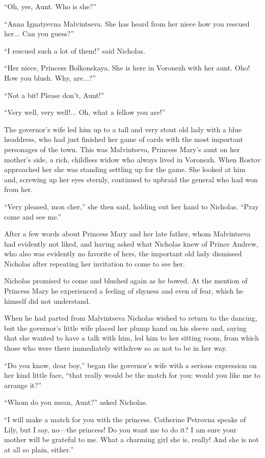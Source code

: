 ``Oh, yes, Aunt. Who is she?''

``Anna Ignatyevna Malvintseva. She has heard from her niece how
you rescued her... Can you guess?''

``I rescued such a lot of them!'' said Nicholas.

``Her niece, Princess Bolkonskaya. She is here in Voronezh with
her aunt.  Oho! How you blush. Why, are...?''

``Not a bit! Please don't, Aunt!''

``Very well, very well!... Oh, what a fellow you are!''

The governor's wife led him up to a tall and very stout old lady
with a blue headdress, who had just finished her game of cards
with the most important personages of the town. This was
Malvintseva, Princess Mary's aunt on her mother's side, a rich,
childless widow who always lived in Voronezh. When Rostov
approached her she was standing settling up for the game. She
looked at him and, screwing up her eyes sternly, continued to
upbraid the general who had won from her.

``Very pleased, mon cher,'' she then said, holding out her hand
to Nicholas. ``Pray come and see me.''

After a few words about Princess Mary and her late father, whom
Malvintseva had evidently not liked, and having asked what
Nicholas knew of Prince Andrew, who also was evidently no
favorite of hers, the important old lady dismissed Nicholas after
repeating her invitation to come to see her.

Nicholas promised to come and blushed again as he bowed. At the
mention of Princess Mary he experienced a feeling of shyness and
even of fear, which he himself did not understand.

When he had parted from Malvintseva Nicholas wished to return to
the dancing, but the governor's little wife placed her plump hand
on his sleeve and, saying that she wanted to have a talk with
him, led him to her sitting room, from which those who were there
immediately withdrew so as not to be in her way.

``Do you know, dear boy,'' began the governor's wife with a
serious expression on her kind little face, ``that really would
be the match for you: would you like me to arrange it?''

``Whom do you mean, Aunt?'' asked Nicholas.

``I will make a match for you with the princess. Catherine
Petrovna speaks of Lily, but I say, no---the princess! Do you
want me to do it? I am sure your mother will be grateful to
me. What a charming girl she is, really! And she is not at all so
plain, either.''

